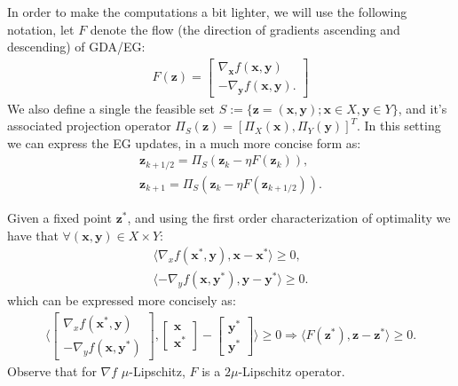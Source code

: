 In order to make the computations a bit lighter, we will use the following notation, let $F$ denote the flow (the direction of gradients ascending and descending) of GDA/EG:
\begin{align*}
    F(\bm{z}) = \begin{bmatrix}
        \nabla_{\bm{x}} f(\bm{x},\bm{y}) \\
        -\nabla_{\bm{y}} f(\bm{x},\bm{y}).
    \end{bmatrix}
\end{align*}
We also define a single the feasible set $S:=\{ \bm{z}=(\bm{x},\bm{y}); \bm{x} \in X, \bm{y} \in Y\}$, and it's associated projection operator $\Pi_S(\bm{z}) = [\Pi_X(\bm{x}),\Pi_Y(\bm{y})]^T$.
In this setting we can express the EG updates, in a much more concise form as:
\begin{align*}
    \bm{z}_{k+1/2} = \Pi_S(\bm{z}_{k}-\eta F(\bm{z}_k)),\\
    \bm{z}_{k+1} = \Pi_S(\bm{z}_{k}-\eta F(\bm{z}_{k+1/2})).
\end{align*}

Given a fixed point $\bm{z}^*$, and using the first order characterization of optimality we have that $\forall (\bm{x},\bm{y}) \in X \times Y$:
\begin{equation*}
    \begin{aligned}
        \langle \nabla_x f(\bm{x}^*,\bm{y}),\bm{x}-\bm{x}^* \rangle \geq 0,\\
        \langle -\nabla_y f(\bm{x},\bm{y}^*),\bm{y}-\bm{y}^* \rangle \geq 0.
    \end{aligned}
\end{equation*}
which can be expressed more concisely as:
\begin{align*}
    \Bigg \langle  \begin{bmatrix}
        \nabla_x f(\bm{x}^*,\bm{y}) \\
        -\nabla_y f(\bm{x},\bm{y}^*)
    \end{bmatrix} ,
    \begin{bmatrix}
        \bm{x} \\ 
        \bm{x}^* 
    \end{bmatrix}
    -
    \begin{bmatrix}
        \bm{y}^* \\
        \bm{y}^*
    \end{bmatrix}
    \Bigg \rangle \geq 0 \Rightarrow \langle F(\bm{z}^*),\bm{z}-\bm{z}^* \rangle \geq 0.
\end{align*}
Observe that for $\nabla f$ $\mu$-Lipschitz, $F$ is a $2\mu$-Lipschitz operator.

